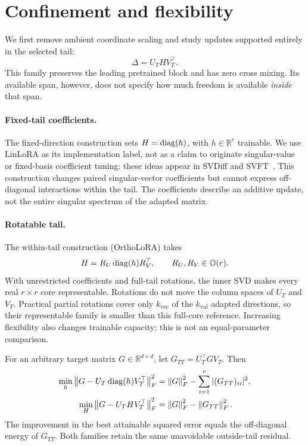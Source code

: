 \section{Confinement and flexibility}
\label{sec:confinement}


We first remove ambient coordinate scaling and study updates supported entirely in the selected tail:
\begin{equation}
\Delta=U_T H V_T^\top.
\label{eq:tailcore}
\end{equation}
This family preserves the leading pretrained block and has zero cross mixing. Its available span, however, does not specify how much freedom is available \emph{inside} that span.

\paragraph{Fixed-tail coefficients.}
The fixed-direction construction sets $H=\operatorname{diag}(h)$, with $h\in\mathbb R^r$ trainable. We use LinLoRA as its implementation label, not as a claim to originate singular-value or fixed-basis coefficient tuning: these ideas appear in SVDiff and SVFT~\citep{han2023svdiff,lingam2024svft}. This construction changes paired singular-vector coefficients but cannot express off-diagonal interactions within the tail. The coefficients describe an additive update, not the entire singular spectrum of the adapted matrix.

\paragraph{Rotatable tail.}
The within-tail construction (OrthoLoRA) takes
\begin{equation}
H=R_U\operatorname{diag}(h)R_V^\top,\qquad R_U,R_V\in\mathbb O(r).
\label{eq:rotations}
\end{equation}
With unrestricted coefficients and full-tail rotations, the inner SVD makes every real $r\times r$ core representable. Rotations do not move the column spaces of $U_T$ and $V_T$. Practical partial rotations cover only $k_{\mathrm{vec}}$ of the $k_{\mathrm{val}}$ adapted directions, so their representable family is smaller than this full-core reference. Increasing flexibility also changes trainable capacity; this is not an equal-parameter comparison.

\begin{proposition}
\label{prop:approximation}
For an arbitrary target matrix $G\in\mathbb R^{d\times d}$, let $G_{TT}=U_T^\top G V_T$. Then
\begin{align}
\min_h\left\|G-U_T\operatorname{diag}(h)V_T^\top\right\|_F^2
&=\left\|G\right\|_F^2-\sum_{i=1}^r |(G_{TT})_{ii}|^2,\label{eq:fixederror}\\
\min_H\left\|G-U_T H V_T^\top\right\|_F^2
&=\left\|G\right\|_F^2-\left\|G_{TT}\right\|_F^2.\label{eq:fullerror}
\end{align}
The improvement in the best attainable squared error equals the off-diagonal energy of $G_{TT}$. Both families retain the same unavoidable outside-tail residual.
\end{proposition}

